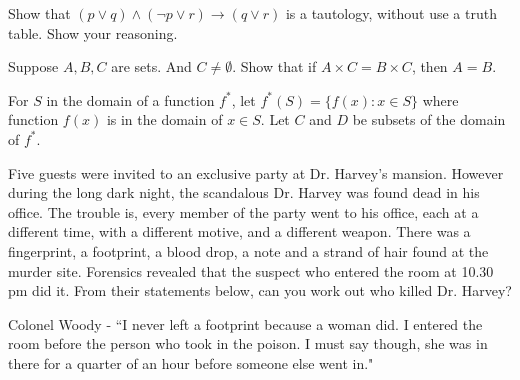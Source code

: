 \documentclass[addpoints]{exam}
\begin{document}
\begin{questions}
\begin{parts}
\end{parts}

\question[10] Show that $(p\vee q) \wedge (\neg p \vee r)\rightarrow (q \vee r)$ is a tautology, without use a truth table. Show your reasoning.

  \begin{solution}
  \end{solution}

\question[20] Suppose $A, B, C$ are sets. And $C \neq \emptyset$. Show that if $A \times C = B \times C$, then $A = B$.

  \begin{solution}
  \end{solution}
\question For $S$ in the domain of a function $f^*$, let $f^*(S) = \{ f(x) : x\in S \}$ where function $f(x)$ is in the domain of $x\in S$. Let $C$ and $D$ be subsets of the domain of $f^*$.

\question
    Five guests were invited to an exclusive party at Dr. Harvey's mansion. However during the long dark night, the scandalous Dr. Harvey was found dead in his office. The trouble is, every member of the party went to his office, each at a different time, with a different motive, and a different weapon. There was a fingerprint, a footprint, a blood drop, a note and a strand of hair found at the murder site. Forensics revealed that the suspect who entered the room at 10.30 pm did it. From their statements below, can you work out who killed Dr. Harvey? 

Colonel Woody - ``I never left a footprint because a woman did. I entered the room before the person who took in the poison. I must say though, she was in there for a quarter of an hour before someone else went in."


\end{questions}
\end{document}
